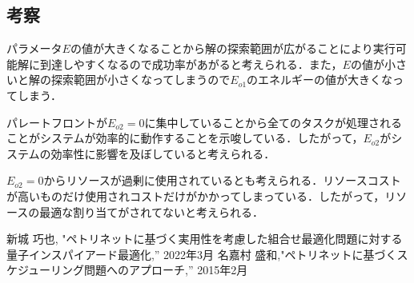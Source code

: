 \documentclass[conference]{IEEEtran}
\begin{document}
\subsection{考察}
パラメータ$E$の値が大きくなることから解の探索範囲が広がることにより実行可能解に到達しやすくなるので成功率があがると考えられる．また，$E$の値が小さいと解の探索範囲が小さくなってしまうので$E_{o1}$のエネルギーの値が大きくなってしまう．

パレートフロントが$E_{o2}=0$に集中していることから全てのタスクが処理されることがシステムが効率的に動作することを示唆している．したがって，$E_{o2}$がシステムの効率性に影響を及ぼしていると考えられる．

$E_{o2}=0$からリソースが過剰に使用されているとも考えられる．リソースコストが高いものだけ使用されコストだけがかかってしまっている．したがって，リソースの最適な割り当てがされてないと考えられる．

\begin{thebibliography}{00}
 新城 巧也, "ペトリネットに基づく実用性を考慮した組合せ最適化問題に対する量子インスパイアード最適化,'' 2022年3月
名嘉村 盛和,"ペトリネットに基づくスケジューリング問題へのアプローチ,'' 2015年2月
\end{thebibliography}
\end{document}
